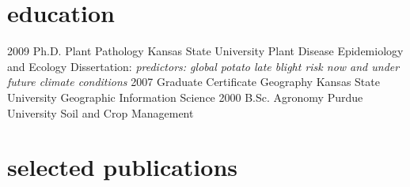 \documentclass[]{friggeri-cv}
\begin{document}
\section{education}

\begin{entrylist}
  \entry
    {2009}
    {Ph.D. {\normalfont Plant Pathology}}
    {Kansas State University}
    {Plant Disease Epidemiology and Ecology}
  \entry
    {}
    {Dissertation: }
    {}
    {\emph{predictors: global potato late blight risk now and under future climate conditions}}
 \entry
    {2007}
    {Graduate Certificate {\normalfont Geography}}
    {Kansas State University}
    {Geographic Information Science}
  \entry
    {2000}
    {B.Sc. {\normalfont Agronomy}}
    {Purdue University}
    {Soil and Crop Management}
\end{entrylist}

\section{selected publications}

\begin{refsection}
  \nocite{*}
  \printbibliography[sorting=chronological, type=inreview, title={in review}, heading=subbibliography]
\end{refsection}
%
%
%
%
%
%
\end{document}
